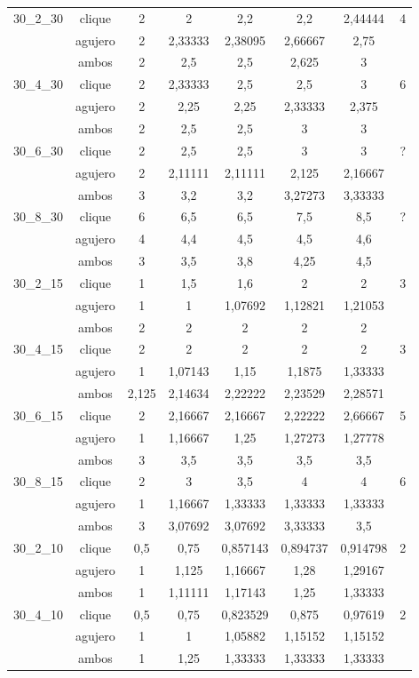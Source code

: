 \documentclass[a4paper]{article}
\begin{document}
\begin{center}
\begin{longtable}{|c|c|c|c|c|c|c|c|}
\hline
30_2_30&clique&2&2&2,2&2,2&2,44444&4\\
\cline{2-7}
&agujero&2&2,33333&2,38095&2,66667&2,75&\\
\cline{2-7}
&ambos&2&2,5&2,5&2,625&3&\\
\hline
30_4_30&clique&2&2,33333&2,5&2,5&3&6\\
\cline{2-7}
&agujero&2&2,25&2,25&2,33333&2,375&\\
\cline{2-7}
&ambos&2&2,5&2,5&3&3&\\
\hline
30_6_30&clique&2&2,5&2,5&3&3&?\\
\cline{2-7}
&agujero&2&2,11111&2,11111&2,125&2,16667&\\
\cline{2-7}
&ambos&3&3,2&3,2&3,27273&3,33333&\\
\hline
30_8_30&clique&6&6,5&6,5&7,5&8,5&?\\
\cline{2-7}
&agujero&4&4,4&4,5&4,5&4,6&\\
\cline{2-7}
&ambos&3&3,5&3,8&4,25&4,5&\\
\hline
30_2_15&clique&1&1,5&1,6&2&2&3\\
\cline{2-7}
&agujero&1&1&1,07692&1,12821&1,21053&\\
\cline{2-7}
&ambos&2&2&2&2&2&\\
\hline
30_4_15&clique&2&2&2&2&2&3\\
\cline{2-7}
&agujero&1&1,07143&1,15&1,1875&1,33333&\\
\cline{2-7}
&ambos&2,125&2,14634&2,22222&2,23529&2,28571&\\
\hline
30_6_15&clique&2&2,16667&2,16667&2,22222&2,66667&5\\
\cline{2-7}
&agujero&1&1,16667&1,25&1,27273&1,27778&\\
\cline{2-7}
&ambos&3&3,5&3,5&3,5&3,5&\\
\hline
30_8_15&clique&2&3&3,5&4&4&6\\
\cline{2-7}
&agujero&1&1,16667&1,33333&1,33333&1,33333&\\
\cline{2-7}
&ambos&3&3,07692&3,07692&3,33333&3,5&\\
\hline
30_2_10&clique&0,5&0,75&0,857143&0,894737&0,914798&2\\
\cline{2-7}
&agujero&1&1,125&1,16667&1,28&1,29167&\\
\cline{2-7}
&ambos&1&1,11111&1,17143&1,25&1,33333&\\
\hline
30_4_10&clique&0,5&0,75&0,823529&0,875&0,97619&2\\
\cline{2-7}
&agujero&1&1&1,05882&1,15152&1,15152&\\
\cline{2-7}
&ambos&1&1,25&1,33333&1,33333&1,33333&\\

\end{longtable}
\end{center}
\end{document}
